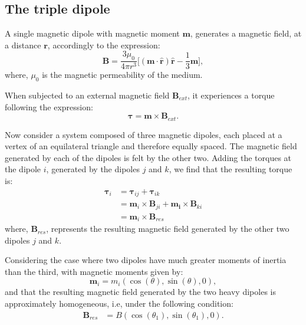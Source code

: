 
\subsection{The triple dipole}
A single magnetic dipole with magnetic moment $\boldsymbol{m}$, generates a magnetic field, at a distance $\boldsymbol{r}$, accordingly to the expression: 
\begin{equation}
    \boldsymbol{B} = \dfrac{3\mu_0}{4 \pi r^3}\bigg[ (\boldsymbol{m \cdot \hat{r}})\boldsymbol{\hat{r}} - \dfrac{1}{3}\boldsymbol{m} \bigg],
    \label{eq:MagneticFieldDipole}
\end{equation}
where, $\mu_0$ is the magnetic permeability of the medium. 

When subjected to an external magnetic field $\boldsymbol{B}_{ext}$, it experiences a torque following the expression: 
\begin{equation}
    \boldsymbol{\tau} = \boldsymbol{m} \times \boldsymbol{B}_{ext}.
    \label{eq:NewtonSecondLaw}
\end{equation}

Now consider a system composed of three magnetic dipoles, each placed at a vertex of an equilateral triangle and therefore equally spaced. The magnetic field generated by each of the dipoles is felt by the other two. Adding the torques at the dipole $i$, generated by the dipoles $j$ and $k$, we find that the resulting torque is:
\begin{equation}
    \begin{aligned}
        \boldsymbol{\tau}_i &= \boldsymbol{\tau}_{ij} + \boldsymbol{\tau}_{ik}\\
            & =  \boldsymbol{m}_i \times \boldsymbol{B}_{j i}+\boldsymbol{m_i} \times \boldsymbol{B}_{k i}\\
            &= \boldsymbol{m}_i \times \boldsymbol{B}_{res}
    \end{aligned}
    \label{eq:Torques}
\end{equation}
where, $\boldsymbol{B}_{res}$, represents the resulting magnetic field generated by the other two dipoles $j$ and $k$. 

Considering the case where two dipoles have much greater moments of inertia than the third, with magnetic moments given by:
\begin{equation}
    \boldsymbol{m}_i = m_i (\cos(\theta), \sin(\theta), 0),
    \label{eq:MagneticMoment}
\end{equation}
and that the resulting magnetic field generated by the two heavy dipoles is approximately homogeneous, i.e, under the following condition:
\begin{equation}
    \begin{aligned}
        \boldsymbol{B}_{res} &= B(\cos(\theta_1),\sin(\theta_1), 0).
    \end{aligned}
    \label{eq:Hipotesys}
\end{equation}

